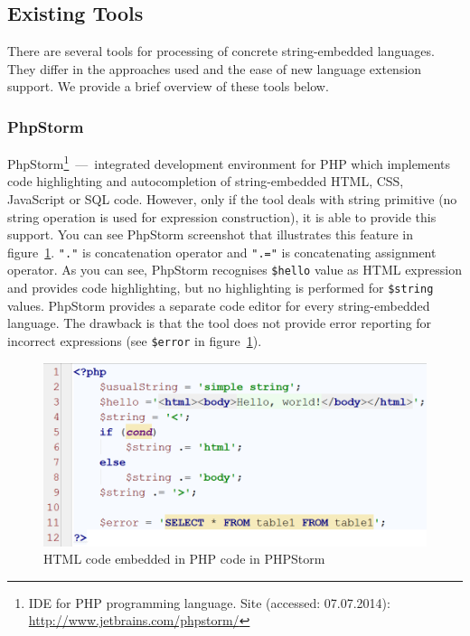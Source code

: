\documentclass{acm_proc_article-sp}
\begin{document}
\subsection{Existing Tools}

There are several tools for processing of concrete string-embedded languages. They differ in the approaches used and the ease of new language extension support. We provide a brief overview of these tools below. \newline



\subsubsection{PhpStorm}

PhpStorm\footnote{IDE for PHP programming language. Site (accessed: 07.07.2014): \url{http://www.jetbrains.com/phpstorm/}}~---~integrated development environment for PHP which implements code highlighting and autocompletion of string-embedded HTML, CSS, JavaScript or SQL code. However, only if the tool deals with string primitive (no string operation is used for expression construction), it is able to provide this support. You can see PhpStorm screenshot that illustrates this feature in figure~\ref{PHPStorm}. \verb|"."| is concatenation operator and \verb|".="| is concatenating assignment operator. As you can see, PhpStorm recognises \verb|$hello| value as HTML expression and provides code highlighting, but no highlighting is performed for \verb|$string| values. PhpStorm provides a separate code editor for every string-embedded language. The drawback is that the tool does not provide error reporting for incorrect expressions (see \verb|$error| in figure~\ref{PHPStorm}).


\begin{figure}[h!]
    \begin{center}
        \includegraphics[scale=0.30]{graphics/PHPStorm.png}
    \end{center}
    \caption{HTML code embedded in PHP code in PHPStorm}
    \label{PHPStorm}
\end{figure} 
\end{document}
